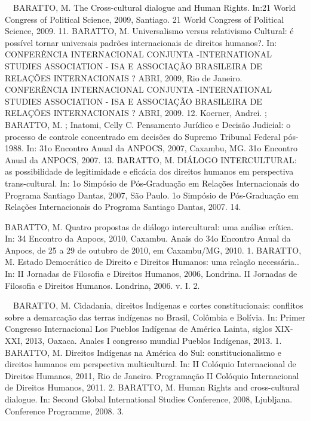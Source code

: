 \begin{cvhonors}
    {\faStar~~BARATTO, M.}
    {The Cross-cultural dialogue and Human Rights. In:21 World Congress of Political Science, 2009, Santiago. 21 World Congress of Political Science, 2009.}
    {}
    {11. }
  \cvhonor
    {BARATTO, M.}
    {Universalismo versus relativismo Cultural: é possível tornar universais padrões internacionais de direitos humanos?. In: CONFERÊNCIA INTERNACIONAL CONJUNTA -INTERNATIONAL STUDIES ASSOCIATION - ISA E ASSOCIAÇÃO BRASILEIRA DE RELAÇÕES INTERNACIONAIS ? ABRI, 2009, Rio de Janeiro. CONFERÊNCIA INTERNACIONAL CONJUNTA -INTERNATIONAL STUDIES ASSOCIATION - ISA E ASSOCIAÇÃO BRASILEIRA DE RELAÇÕES INTERNACIONAIS ? ABRI, 2009.}
    {}
    {12. }
  \cvhonor
    {Koerner, Andrei. ; BARATTO, M. ; Inatomi, Celly C.}
    {Pensamento Jurídico e Decisão Judicial: o processo de controle
    concentrado em decisões do Supremo Tribunal Federal pós-1988. In: 31o Encontro Anual da ANPOCS, 2007, Caxambu,
    MG. 31o Encontro Anual da ANPOCS, 2007.}
    {}
    {13. }
  \cvhonor
    {BARATTO, M.}
    {DIÁLOGO INTERCULTURAL: as possibilidade de legitimidade e eficácia dos direitos humanos em perspectiva trans-cultural. In: 1o Simpósio de Pós-Graduação em Relações Internacionais do Programa Santiago Dantas, 2007, São Paulo. 1o Simpósio de Pós-Graduação em Relações Internacionais do Programa Santiago Dantas, 2007.}
    {}
    {14. }
\end{cvhonors}


\begin{cvhonors}
  \cvhonor
    {BARATTO, M.}
    {Quatro propostas de diálogo intercultural: uma análise crítica. In: 34 Encontro da Anpocs, 2010, Caxambu. Anais do 34o Encontro Anual da Anpocs, de 25 a 29 de outubro de 2010, em Caxambu/MG, 2010.}
    {}
    {1. }
  \cvhonor
    {BARATTO, M.}
  {Estado Democrático de Direito e Direitos Humanos: uma relação necessária.. In: II Jornadas de Filosofia e Direitos Humanos, 2006, Londrina. II Jornadas de Filosofia e Direitos Humanos. Londrina, 2006. v. I.}
    {}
    {2. }
\end{cvhonors}


\begin{cvhonors}
  \cvhonor
    {\faStar~~BARATTO, M.}
    {Cidadania, direitos Indígenas e cortes constitucionais: conflitos sobre a demarcação das terras indígenas no Brasil, Colômbia e Bolívia. In: Primer Congresso Internacional Los Pueblos Indígenas de América Lainta, siglos XIX-XXI, 2013, Oaxaca. Anales I congresso mundial Pueblos Indígenas, 2013.}
    {}
    {1. }
  \cvhonor
    {BARATTO, M.}
    {Direitos Indígenas na América do Sul: constitucionalismo e direitos humanos em perspectiva multicultural. In: II Colóquio Internacional de Direitos Humanos, 2011, Rio de Janeiro. Programação II Colóquio Internacional de Direitos Humanos, 2011.}
    {}
    {2. }
  \cvhonor
    {BARATTO, M.}
    {Human Rights and cross-cultural dialogue. In: Second Global International Studies Conference, 2008, Ljubljana. Conference Programme, 2008.}
    {}
    {3. }
\end{cvhonors}
\pagebreak
{}

